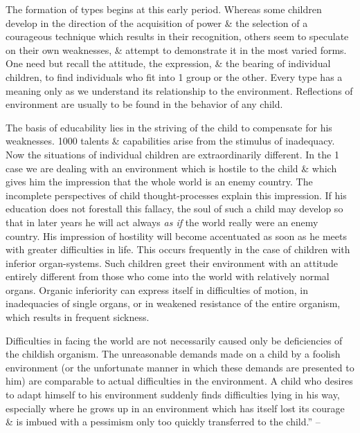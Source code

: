 \documentclass{article}
\begin{document}
The formation of types begins at this early period. Whereas some children develop in the direction of the acquisition of power \& the selection of a courageous technique which results in their recognition, others seem to speculate on their own weaknesses, \& attempt to demonstrate it in the most varied forms. One need but recall the attitude, the expression, \& the bearing of individual children, to find individuals who fit into 1 group or the other. Every type has a meaning only as we understand its relationship to the environment. Reflections of environment are usually to be found in the behavior of any child.

The basis of educability lies in the striving of the child to compensate for his weaknesses. 1000 talents \& capabilities arise from the stimulus of inadequacy. Now the situations of individual children are extraordinarily different. In the 1 case we are dealing with an environment which is hostile to the child \& which gives him the impression that the whole world is an enemy country. The incomplete perspectives of child thought-processes explain this impression. If his education does not forestall this fallacy, the soul of such a child may develop so that in later years he will act always {\it as if} the world really were an enemy country. His impression of hostility will become accentuated as soon as he meets with greater difficulties in life. This occurs frequently in the case of children with inferior organ-systems. Such children greet their environment with an attitude entirely different from those who come into the world with relatively normal organs. Organic inferiority can express itself in difficulties of motion, in inadequacies of single organs, or in weakened resistance of the entire organism, which results in frequent sickness.

Difficulties in facing the world are not necessarily caused only be deficiencies of the childish organism. The unreasonable demands made on a child by a foolish environment (or the unfortunate manner in which these demands are presented to him) are comparable to actual difficulties in the environment. A child who desires to adapt himself to his environment suddenly finds difficulties lying in his way, especially where he grows up in an environment which has itself lost its courage \& is imbued with a pessimism only too quickly transferred to the child.'' -- \cite[pp. 33--35]{Adler_human_nature}
\end{document}
